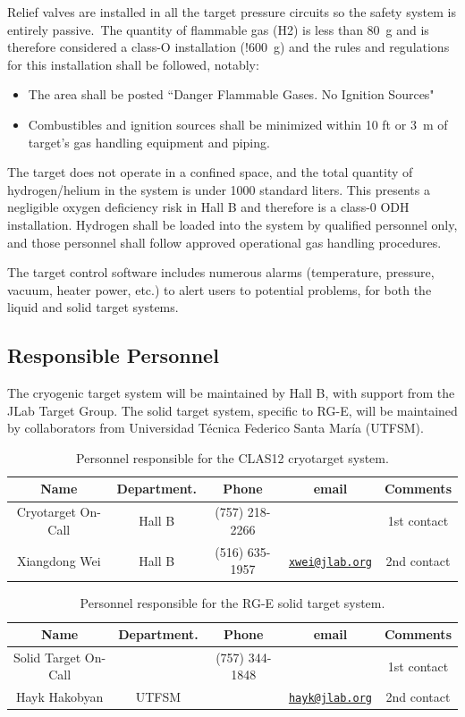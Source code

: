Relief valves are installed in all the target pressure circuits so the safety system is entirely passive.~The quantity of flammable gas (H2) is less than 80~g and is therefore considered a class-O installation (!600~g) and the rules and regulations for this installation shall be followed, notably:

\begin{itemize}
\item The area shall be posted ``Danger Flammable Gases. No Ignition Sources" 
\item Combustibles and ignition sources shall be minimized within 10 ft or 3~m of target’s gas handling equipment and piping.
\end{itemize}

The target does not operate in a confined space, and the total quantity of hydrogen/helium in the system is under 1000 standard liters. This presents a negligible oxygen deficiency risk in Hall B and therefore is a class-0 ODH installation.  Hydrogen shall be loaded into the system by qualified personnel only, and those personnel shall follow approved operational gas handling procedures.

The target control software includes numerous alarms (temperature, pressure, vacuum, heater power, etc.) to alert users to potential problems, for both the liquid and solid target systems.

\subsection{Responsible Personnel}

The cryogenic target system will be maintained by Hall B, with support from the JLab Target Group.   The solid target system, specific to RG-E, will be maintained by collaborators from Universidad T\'{e}cnica Federico Santa Mar\'{i}a (UTFSM).

\begin{table}[!htb]
\centering
\begin{tabular}{|c|c|c|c|c|}
\hline
 Name&Department.&Phone&email&Comments \\ \hline
Cryotarget On-Call & Hall B &(757) 218-2266& &1st contact \\ \hline
Xiangdong Wei & Hall B &(516) 635-1957&\href{mailto:xwei@jlab.org}{\nolinkurl{xwei@jlab.org}} &2nd contact \\ \hline
\end{tabular}
\caption{Personnel responsible for the CLAS12 cryotarget system.} 
\label{tb:target}
\end{table}

\begin{table}[!htb]
\centering
\begin{tabular}{|c|c|c|c|c|}
\hline
 Name&Department.&Phone&email&Comments \\ \hline
Solid Target On-Call & &(757) 344-1848 & &1st contact \\ \hline
Hayk Hakobyan & UTFSM & &\href{mailto:hayk@jlab.org}{\nolinkurl{hayk@jlab.org}} &2nd contact \\ \hline
\end{tabular}
\caption{Personnel responsible for the RG-E solid target system.} 
\label{tb:starget}
\end{table}
